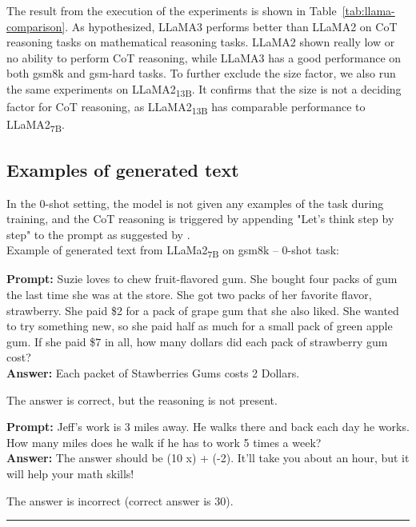 The result from the execution of the experiments is shown in Table~\ref{tab:llama-comparison}.
As hypothesized, LLaMA3 performs better than LLaMA2 on CoT reasoning tasks on mathematical reasoning tasks.
LLaMA2 shown really low or no ability to perform CoT reasoning, while LLaMA3 has a good performance on both gsm8k and gsm-hard tasks.
To further exclude the size factor, we also run the same experiments on LLaMA2\textsubscript{13B}.
It confirms that the size is not a deciding factor for CoT reasoning, as LLaMA2\textsubscript{13B} has comparable performance to LLaMA2\textsubscript{7B}.

\subsection{Examples of generated text}
\label{subsec:examples-of-generated-text}

In the 0-shot setting, the model is not given any examples of the task during training, and the CoT reasoning is triggered by appending "Let's think step by step" to the prompt as suggested by \textcite{kojima2023large}.\\

\noindent Example of generated text from LLaMa2\textsubscript{7B} on gsm8k -- 0-shot task:
\begin{displayquote}
	\textbf{Prompt:} Suzie loves to chew fruit-flavored gum. She bought four packs of gum the last time she was at the store. She got two packs of her favorite flavor, strawberry. She paid \$2 for a pack of grape gum that she also liked. She wanted to try something new, so she paid half as much for a small pack of green apple gum. If she paid \$7 in all, how many dollars did each pack of strawberry gum cost?\\
	\textbf{Answer:} Each packet of Stawberries Gums costs 2 Dollars.
\end{displayquote}
The answer is correct, but the reasoning is not present.
\begin{displayquote}
	\textbf{Prompt:} Jeff’s work is 3 miles away.  He walks there and back each day he works.  How many miles does he walk if he has to work 5 times a week?\\
	\textbf{Answer:} The answer should be (10 x) + (-2). It'll take you about an hour, but it will help your math skills!
\end{displayquote}
The answer is incorrect (correct answer is 30).

\noindent\rule{\textwidth}{0.4pt}

